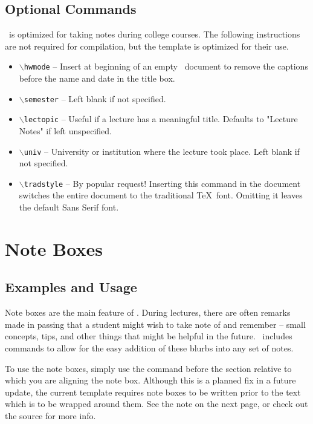 \documentclass{ClassTeX}
\begin{document}
	\subsection{Optional Commands}
	\ClassTeX\ is optimized for taking notes during college courses.  The following instructions are not required for compilation, but the template is optimized for their use.
	\begin{itemize}
		\item \texttt{$\backslash$hwmode} -- Insert at beginning of an empty \ClassTeX\ document to remove the captions before the name and date in the title box.
		\item \texttt{$\backslash$semester} -- Left blank if not specified.
		\item \texttt{$\backslash$lectopic} -- Useful if a lecture has a meaningful title.  Defaults to "Lecture Notes" if left unspecified.
		\item \texttt{$\backslash$univ} -- University or institution where the lecture took place.  Left blank if not specified.
		\item \texttt{$\backslash$tradstyle} -- By popular request!  Inserting this command in the document switches the entire document to the traditional \TeX\ font.  Omitting it leaves the default Sans Serif font.
	\end{itemize}

	\section{Note Boxes}
	
	\subsection{Examples and Usage}
		
	Note boxes are the main feature of \ClassTeX.  During lectures, there are often remarks made in passing that a student might wish to take note of and remember -- small concepts, tips, and other things that might be helpful in the future.  \ClassTeX\ includes commands to allow for the easy addition of these blurbs into any set of notes.
	
	To use the note boxes, simply use the command before the section relative to which you are aligning the note box.  Although this is a planned fix in a future update, the current template requires note boxes to be written prior to the text which is to be wrapped around them.  See the note on the next page, or check out the source for more info.
\end{document}
